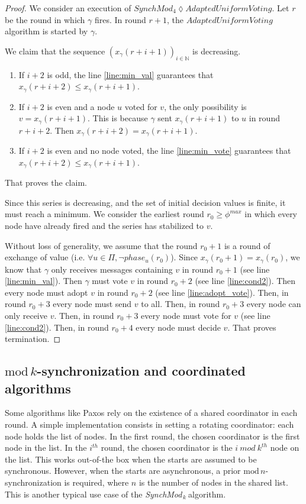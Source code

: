 \documentclass{article}
\newcommand{\cent}{\gamma}
\newcommand{\SM}{{\em SynchMod}$_{\,k}\ $}
\begin{document}
\begin{proof}
	We consider an execution of $SynchMod_4 \lozenge AdaptedUniformVoting$.
	Let $r$ be the round in which $\cent$ fires.
	In round $r+1$, the $AdaptedUniformVoting$ algorithm is started by $\cent$.

	We claim that the sequence $(x_\cent(r+i+1))_{i \in \mathds{N}}$ is decreasing.
	\begin{enumerate}
		\item If $i+2$ is odd, the line \ref{line:min_val} guarantees that $x_\cent(r+i+2) \leq x_\cent(r+i+1)$.
		\item If $i+2$ is even and a node $u$ voted for $v$, the only possibility is $v = x_\cent(r+i+1)$. This is because $\cent$ sent $x_\cent(r+i+1)$ to $u$ in round $r+i+2$.
			Then $x_\cent(r+i+2) = x_\cent(r+i+1)$.
		\item If $i+2$ is even and no node voted, the line \ref{line:min_vote} guarantees that $x_\cent(r+i+2) \leq x_\cent(r+i+1)$.
	\end{enumerate}
	That proves the claim.

	Since this series is decreasing, and the set of initial decision values is finite, it must reach a minimum.
	We consider the earliest round $r_0 \geq \phi^{max}$ in which every node have already fired and the series has stabilized to $v$.

	Without loss of generality, we assume that the round $r_0+1$ is a round of exchange of value (i.e. $\forall u \in \Pi, \neg phase_u(r_0)$).
	Since $x_\cent(r_0+1) = x_\cent(r_0)$, we know that $\cent$ only receives messages containing $v$ in round $r_0+1$ (see line \ref{line:min_val}).
	Then $\cent$ must vote $v$ in round $r_0+2$ (see line \ref{line:cond2}).
	Then every node must adopt $v$ in round $r_0+2$ (see line \ref{line:adopt_vote}).
	Then, in round $r_0+3$ every node must send $v$ to all.
	Then, in round $r_0+3$ every node can only receive $v$.
	Then, in round $r_0+3$ every node must vote for $v$ (see line \ref{line:cond2}).
	Then, in round $r_0+4$ every node must decide $v$.
	That proves termination.
\end{proof}

\subsection{$\mathrm{mod}\,k$-synchronization and coordinated algorithms}

Some algorithms like Paxos rely on the existence of a shared coordinator in each round.
A simple implementation consists in setting a rotating coordinator: 
each node holds the list of nodes. In the first round, the chosen coordinator is the first node in the list.
In the $i^{th}$ round, the chosen coordinator is the $i~mod~k^{th}$ node on the list.
This works out-of-the box when the starts are assumed to be synchronous.
However, when the starts are asynchronous, a prior $\mathrm{mod}\,n$-synchronization is required, where $n$ is the number of nodes in the shared list.
This is another typical use case of the \SM algorithm.
\end{document}
